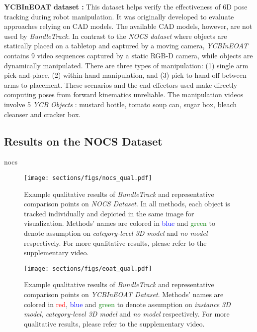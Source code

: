\documentclass[letterpaper, 10 pt, conference]{ieeeconf}
\begin{document}
\noindent \textbf{YCBInEOAT dataset \cite{wense3tracknet}:} This dataset helps verify the effectiveness of 6D pose tracking during robot manipulation. It was originally developed to evaluate approaches relying on CAD models. The available CAD models, however, are not used by \textit{BundleTrack}. In contrast to the \textit{NOCS dataset} where objects are statically placed on a tabletop and captured by a moving camera, \textit{YCBInEOAT} contains 9 video sequences captured by a static RGB-D camera, while objects are dynamically manipulated. There are three types of manipulation: (1) single arm pick-and-place, (2) within-hand manipulation, and (3) pick to hand-off between arms to placement. These scenarios and the end-effectors used make directly computing poses from forward kinematics unreliable.  The manipulation videos involve 5 \textit{YCB Objects} \cite{calli2015benchmarking}: mustard bottle, tomato soup can, sugar box, bleach cleanser and cracker box. 

\subsection{Results on the NOCS Dataset} 
\label{sec:eval_nocs}
{nocs}


\begin{figure}[h]
  \centering
  \texttt{[image: sections/figs/nocs\_qual.pdf]}
  \vspace{-0.25in}\caption{Example qualitative results of \textit{BundleTrack} and representative comparison points on \textit{NOCS Dataset}. In all methods, each object is tracked individually and depicted in the same image for visualization. Methods' names are colored in \textcolor{blue}{blue} and \textcolor{green}{green} to denote assumption on \textit{category-level 3D model} and \textit{no model} respectively. For more qualitative results, please refer to the supplementary video.}
  \label{fig:nocs_qual}
  \vspace{-0.3in}
\end{figure}

\begin{figure}[h]
  \centering
  \vspace{+0.05in}
  \texttt{[image: sections/figs/eoat\_qual.pdf]}
  \vspace{-0.25in}\caption{Example qualitative results of \textit{BundleTrack} and representative comparison points on \textit{YCBInEOAT Dataset}. Methods' names are colored in \textcolor{red}{red}, \textcolor{blue}{blue} and \textcolor{green}{green} to denote assumption on \textit{instance 3D model}, \textit{category-level 3D model} and \textit{no model} respectively. For more qualitative results, please refer to the supplementary video.}
  \vspace{-0.3in}
  \label{fig:eoat_qual}
\end{figure}
\end{document}
